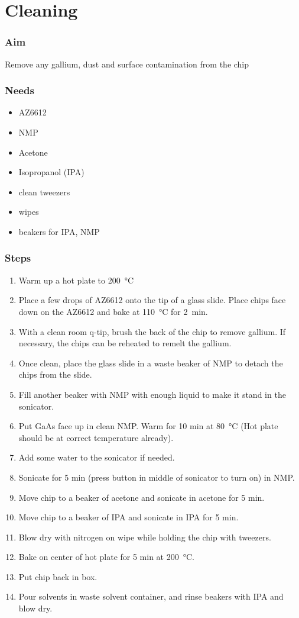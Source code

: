 \section{Cleaning}

\subsubsection{Aim}
Remove any gallium, dust and surface contamination from the chip

\subsubsection{Needs}
\begin{itemize} [noitemsep]
\item AZ6612
\item NMP
\item Acetone
\item Isopropanol (IPA)
\item clean tweezers
\item wipes
\item beakers for IPA, NMP
\end{itemize}

\subsubsection{Steps}
\begin{enumerate}
\item Warm up a hot plate to \SI{200}{\celsius}
\item Place a few drops of AZ6612 onto the tip of a glass slide. Place chips face down on the AZ6612 and bake at \SI{110}{\celsius}
      for \SI{2}{\minute}.
\item With a clean room q-tip, brush the back of the chip to remove gallium. If necessary, the chips can be reheated to remelt the gallium.
\item Once clean, place the glass slide in a waste beaker of NMP to detach the chips from the slide.
\item Fill another beaker with NMP with enough liquid to make it stand in the sonicator.
\item Put GaAs face up in clean NMP. Warm for 10 min at \SI{80}{\celsius} (Hot plate should be at correct temperature already).
\item Add some water to the sonicator if needed.
\item Sonicate for 5 min (press button in middle of sonicator to turn on) in NMP.
\item Move chip to a beaker of acetone and sonicate in acetone for 5 min.
\item Move chip to a beaker of IPA and sonicate in IPA for 5 min.
\item Blow dry with nitrogen on wipe while holding the chip with tweezers.
\item Bake on center of hot plate for 5 min at \SI{200}{\celsius}.
\item Put chip back in box.
\item Pour solvents in waste solvent container, and rinse beakers with IPA and blow dry.
\end{enumerate}


